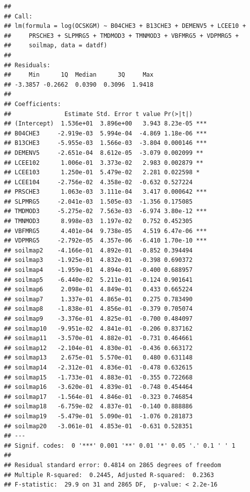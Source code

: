 \documentclass[10pt,b5paper,]{book}
\theoremstyle{definition}
\theoremstyle{definition}
\theoremstyle{definition}
\theoremstyle{remark}
\begin{document}
\begin{verbatim}
## 
## Call:
## lm(formula = log(OCSKGM) ~ B04CHE3 + B13CHE3 + DEMENV5 + LCEE10 + 
##     PRSCHE3 + SLPMRG5 + TMDMOD3 + TMNMOD3 + VBFMRG5 + VDPMRG5 + 
##     soilmap, data = datdf)
## 
## Residuals:
##     Min      1Q  Median      3Q     Max 
## -3.3857 -0.2662  0.0390  0.3096  1.9418 
## 
## Coefficients:
##               Estimate Std. Error t value Pr(>|t|)    
## (Intercept)  1.536e+01  3.896e+00   3.943 8.23e-05 ***
## B04CHE3     -2.919e-03  5.994e-04  -4.869 1.18e-06 ***
## B13CHE3     -5.955e-03  1.566e-03  -3.804 0.000146 ***
## DEMENV5     -2.651e-04  8.612e-05  -3.079 0.002099 ** 
## LCEE102      1.006e-01  3.373e-02   2.983 0.002879 ** 
## LCEE103      1.250e-01  5.479e-02   2.281 0.022598 *  
## LCEE104     -2.756e-02  4.358e-02  -0.632 0.527224    
## PRSCHE3      1.063e-03  3.111e-04   3.417 0.000642 ***
## SLPMRG5     -2.041e-03  1.505e-03  -1.356 0.175085    
## TMDMOD3     -5.275e-02  7.563e-03  -6.974 3.80e-12 ***
## TMNMOD3      8.998e-03  1.197e-02   0.752 0.452305    
## VBFMRG5      4.401e-04  9.738e-05   4.519 6.47e-06 ***
## VDPMRG5     -2.792e-05  4.357e-06  -6.410 1.70e-10 ***
## soilmap2    -4.166e-01  4.892e-01  -0.852 0.394494    
## soilmap3    -1.925e-01  4.832e-01  -0.398 0.690372    
## soilmap4    -1.959e-01  4.894e-01  -0.400 0.688957    
## soilmap5    -6.440e-02  5.211e-01  -0.124 0.901641    
## soilmap6     2.098e-01  4.849e-01   0.433 0.665224    
## soilmap7     1.337e-01  4.865e-01   0.275 0.783490    
## soilmap8    -1.838e-01  4.856e-01  -0.379 0.705074    
## soilmap9    -3.376e-01  4.825e-01  -0.700 0.484097    
## soilmap10   -9.951e-02  4.841e-01  -0.206 0.837162    
## soilmap11   -3.570e-01  4.882e-01  -0.731 0.464661    
## soilmap12   -2.104e-01  4.830e-01  -0.436 0.663172    
## soilmap13    2.675e-01  5.570e-01   0.480 0.631148    
## soilmap14   -2.312e-01  4.836e-01  -0.478 0.632615    
## soilmap15   -1.733e-01  4.883e-01  -0.355 0.722668    
## soilmap16   -3.620e-01  4.839e-01  -0.748 0.454464    
## soilmap17   -1.564e-01  4.846e-01  -0.323 0.746854    
## soilmap18   -6.759e-02  4.837e-01  -0.140 0.888886    
## soilmap19   -5.479e-01  5.090e-01  -1.076 0.281873    
## soilmap20   -3.061e-01  4.853e-01  -0.631 0.528351    
## ---
## Signif. codes:  0 '***' 0.001 '**' 0.01 '*' 0.05 '.' 0.1 ' ' 1
## 
## Residual standard error: 0.4814 on 2865 degrees of freedom
## Multiple R-squared:  0.2445, Adjusted R-squared:  0.2363 
## F-statistic:  29.9 on 31 and 2865 DF,  p-value: < 2.2e-16
\end{verbatim}
\end{document}
